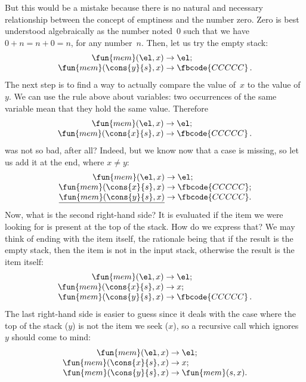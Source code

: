 But this would be a mistake because there is no natural and necessary
relationship between the concept of emptiness and the number
zero. Zero is best understood algebraically as the number noted~\(0\)
such that we have \(0 + n = n + 0 = n\), for any number~\(n\). Then,
let us try the empty stack:
\begin{equation*}
\begin{array}{r@{\;}c@{\;}l}
\fun{mem}(\el,x) & \rightarrow & \el;\\
\fun{mem}(\cons{y}{s},x) & \rightarrow & \fbcode{CCCCC}\,.
\end{array}
\end{equation*}
The next step is to find a way to actually compare the value of~\(x\)
to the value of~\(y\). We can use the rule above about variables: two
occurrences of the same variable mean that they hold the same
value. Therefore
\begin{equation*}
\begin{array}{r@{\;}c@{\;}l}
\fun{mem}(\el,x) & \rightarrow & \el;\\
\fun{mem}(\cons{x}{s},x) & \rightarrow & \fbcode{CCCCC}\,.
\end{array}
\end{equation*}
was not so bad, after all? Indeed, but we know now that a case is
missing, so let us add it at the end, where \(x \neq y\):
\begin{equation*}
\begin{array}{r@{\;}c@{\;}l}
\fun{mem}(\el,x) & \rightarrow & \el;\\
\fun{mem}(\cons{x}{s},x) & \rightarrow & \fbcode{CCCCC};\\
\underline{\fun{mem}(\cons{y}{s},x)} & \rightarrow & \fbcode{CCCCC}.
\end{array}
\end{equation*}
Now, what is the second right\hyp{}hand side? It is evaluated if the
item we were looking for is present at the top of the stack. How do we
express that? We may think of ending with the item itself, the
rationale being that if the result is the empty stack, then the item
is not in the input stack, otherwise the result is the item itself:
\begin{equation*}
\begin{array}{r@{\;}c@{\;}l}
\fun{mem}(\el,x) & \rightarrow & \el;\\
\fun{mem}(\cons{x}{s},x) & \rightarrow & x;\\
\fun{mem}(\cons{y}{s},x) & \rightarrow & \fbcode{CCCCC}\,.
\end{array}
\end{equation*}
The last right\hyp{}hand side is easier to guess since it deals with
the case where the top of the stack (\(y\)) is not the item we seek
(\(x\)), so a recursive call which ignores~\(y\) should come to mind:
\begin{equation*}
\begin{array}{r@{\;}c@{\;}l}
\fun{mem}(\el,x) & \rightarrow & \el;\\
\fun{mem}(\cons{x}{s},x) & \rightarrow & x;\\
\fun{mem}(\cons{y}{s},x) & \rightarrow & \fun{mem}(s,x).
\end{array}
\end{equation*}

